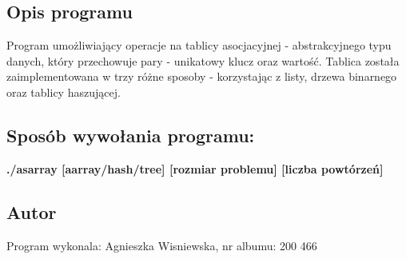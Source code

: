 \hypertarget{index_description}{}\subsection{Opis programu}\label{index_description}
Program umożliwiający operacje na tablicy asocjacyjnej -\/ abstrakcyjnego typu danych, który przechowuje pary -\/ unikatowy klucz oraz wartość. Tablica została zaimplementowana w trzy różne sposoby -\/ korzystając z listy, drzewa binarnego oraz tablicy haszującej.\hypertarget{index_sample}{}\subsection{Sposób wywołania programu\-:}\label{index_sample}
{\bfseries ./asarray \mbox{[}aarray/hash/tree\mbox{]} \mbox{[}rozmiar problemu\mbox{]} \mbox{[}liczba powtórzeń\mbox{]}}\hypertarget{index_author}{}\subsection{Autor}\label{index_author}
Program wykonala\-: Agnieszka Wisniewska, nr albumu\-: 200 466 